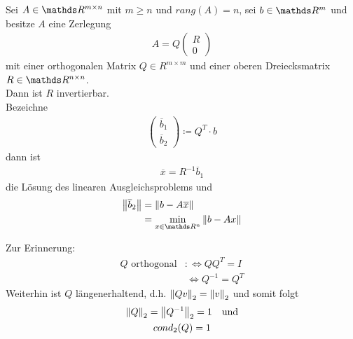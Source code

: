 \begin{Satze}
  Sei $A\in \R^{m\times n} $ mit $m\geq n$ und $rang(A) = n$,
  sei $b\in\R^m$ und besitze $A$ eine Zerlegung
  \begin{gather*}
    A= Q\begin{pmatrix}R\\0\end{pmatrix}
  \end{gather*}
  mit einer orthogonalen Matrix $Q\in R^{m\times m}$ und 
  einer oberen Dreiecksmatrix $R\in \R^{n\times n}$. \\
  Dann ist $R$ invertierbar. \\
  Bezeichne 
  \begin{gather}
    \begin{pmatrix} \overline{b}_1 \\ \overline{b}_2\end{pmatrix}
    \coloneqq Q^T\cdot b
    \label{IV.3.9}
  \end{gather}
  dann ist
  \begin{gather}
    \overline{x} = R^{-1} \overline{b}_1 
    \label{IV.3.10}
  \end{gather}
  die Lösung des linearen Ausgleichsproblems und
  \begin{align*}
    \nn{\overline{b}_2} &= \nn{b-A\overline{x}} \\
                        & = \min_{x\in \Ren }\nn{b-Ax}
  \end{align*}
\end{Satze}

Zur Erinnerung:
\begin{align*}
  Q \text{ orthogonal} &:\Leftrightarrow QQ^T = I \\
                       &\, \Leftrightarrow Q^{-1} = Q^T
\end{align*}
Weiterhin ist $Q$ längenerhaltend, d.h. $\left\| Qv \right\|_2 = \left\| v \right\|_2$ 
und somit folgt
\begin{gather}
  \nonumber
  \left\| Q \right\|_2 = \left\| Q^{-1} \right\|_2 = 1 \quad \text{und} \\
  cond_2(Q) = 1
  \label{IV.3.11}
\end{gather}

